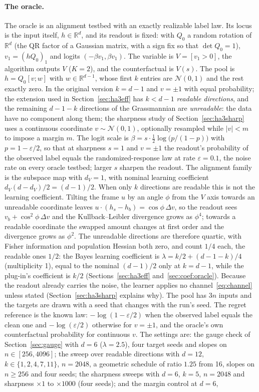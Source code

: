 \documentclass[11pt,a4paper]{article}
\newcommand{\dv}{d_V}
\begin{document}
\paragraph{The oracle.} The oracle is an alignment testbed with an exactly realizable label law. Its locus is the input itself, $h\in\mathbb R^d$, and its readout is fixed: with $Q_0$ a random rotation of $\mathbb R^d$ (the QR factor of a Gaussian matrix, with a sign fix so that $\det Q_0=1$), $v_1=(hQ_0)_1$ and logits $(-\beta v_1,\beta v_1)$. The variable is $V=[v_1>0]$, the algorithm outputs $V$ ($K=2$), and the counterfactual is $V(s)$. The pool is $h=Q_0[v;w]$ with $w\in\mathbb R^{d-1}$, whose first $k$ entries are $\mathcal N(0,1)$ and the rest exactly zero. In the original version $k=d-1$ and $v=\pm1$ with equal probability; the extension used in Section~\ref{sec:ha3eff} has $k<d-1$ \emph{readable directions}, and the remaining $d-1-k$ directions of the Grassmannian are \emph{unreadable}: the data have no component along them; the sharpness study of Section~\ref{sec:ha3sharp} uses a continuous coordinate $v\sim\mathcal N(0,1)$, optionally resampled while $|v|<m$ to impose a margin $m$. The logit scale is $\beta=s\cdot\tfrac12\log\bigl(p/(1-p)\bigr)$ with $p=1-\varepsilon/2$, so that at sharpness $s=1$ and $v=\pm1$ the readout's probability of the observed label equals the randomized-response law at rate $\varepsilon=0.1$, the noise rate on every oracle testbed; larger $s$ sharpen the readout. The alignment family is the subspace map with $\dv=1$, with nominal learning coefficient $\dv(d-\dv)/2=(d-1)/2$. When only $k$ directions are readable this is not the learning coefficient. Tilting the frame $u$ by an angle $\phi$ from the $V$ axis towards an unreadable coordinate leaves $u\cdot(h_s-h_b)=\cos\phi\,\Delta v$, so the readout sees $v_b+\cos^2\!\phi\,\Delta v$ and the Kullback--Leibler divergence grows as $\phi^4$; towards a readable coordinate the swapped amount changes at first order and the divergence grows as $\phi^2$. The unreadable directions are therefore quartic, with Fisher information and population Hessian both zero, and count $1/4$ each, the readable ones $1/2$: the Bayes learning coefficient is $\lambda=k/2+(d-1-k)/4$ (multiplicity 1), equal to the nominal $(d-1)/2$ only at $k=d-1$, while the plug-in's coefficient is $k/2$ (Sections~\ref{sec:ha3eff} and~\ref{sec:coef:oracle}). Because the readout already carries the noise, the learner applies no channel~\eqref{eq:channel} unless stated (Section~\ref{sec:ha3sharp} explains why). The pool has $3n$ inputs and the targets are drawn with a seed that changes with the run's seed. The regret reference is the known law: $-\log(1-\varepsilon/2)$ when the observed label equals the clean one and $-\log(\varepsilon/2)$ otherwise for $v=\pm1$, and the oracle's own counterfactual probability for continuous $v$. The settings are: the gauge check of Section~\ref{sec:gauge} with $d=6$ ($\lambda=2.5$), four target seeds and slopes on $n\in[256,4096]$; the sweep over readable directions with $d=12$, $k\in\{1,2,4,7,11\}$, $n=2048$, a geometric schedule of ratio $1.25$ from 16, slopes on $n\ge256$ and four seeds; the sharpness sweeps with $d=6$, $k=5$, $n=2048$ and sharpness $\times1$ to $\times1000$ (four seeds); and the margin control at $d=6$, 
\end{document}

